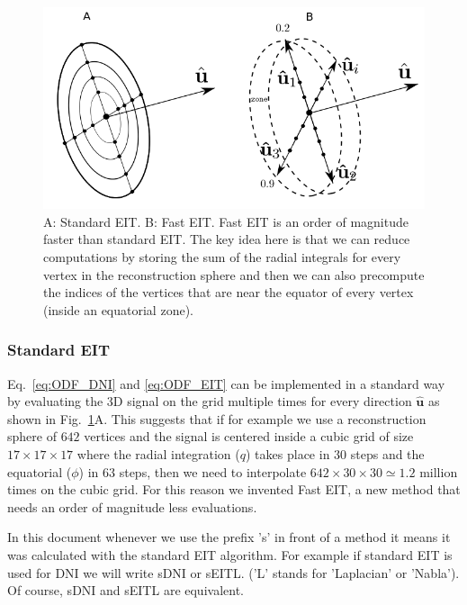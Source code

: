 \documentclass{bioinfo}
\begin{document}
\begin{methods}
%
\begin{figure}
\begin{centering}
\includegraphics[scale=0.5]{figures/fast_DNI}
\par\end{centering}

\caption{A: Standard EIT. B: Fast EIT. Fast EIT is an order of magnitude faster
than standard EIT. The key idea here is that we can reduce computations
by storing the sum of the radial integrals for every vertex in the
reconstruction sphere and then we can also precompute the indices
of the vertices that are near the equator of every vertex (inside
an equatorial zone).}


\label{Flo:sEITvsEIT}
\end{figure}

\subsubsection{Standard EIT\label{sub:Standard-EIT}}

Eq.~\ref{eq:ODF_DNI} and \ref{eq:ODF_EIT} can be implemented in
a standard way by evaluating the 3D signal on the grid multiple times
for every direction $\hat{\bm{u}}$ as shown in Fig.~\ref{Flo:sEITvsEIT}A.
This suggests that if for example we use a reconstruction sphere of
$642$ vertices and the signal is centered inside a cubic grid of
size $17\times17\times17$ where the radial integration ($q$) takes
place in $30$ steps and the equatorial ($\phi$) in $63$ steps,
then we need to interpolate $642\times30\times30\simeq1.2$ million
times on the cubic grid. For this reason we invented Fast EIT, a new
method that needs an order of magnitude less evaluations.

In this document whenever we use the prefix 's' in front of a method
it means it was calculated with the standard EIT algorithm. For example
if standard EIT is used for DNI we will write sDNI or sEITL. ('L'
stands for 'Laplacian' or 'Nabla'). Of course, sDNI and sEITL are
equivalent.


\end{methods}
\end{document}
